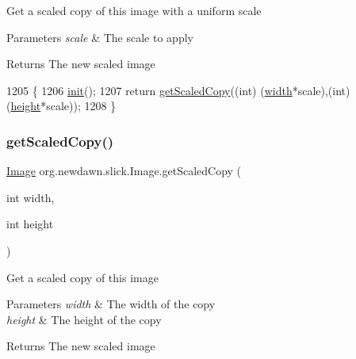 Get a scaled copy of this image with a uniform scale


\begin{DoxyParams}{Parameters}
{\em scale} & The scale to apply \\
\hline
\end{DoxyParams}
\begin{DoxyReturn}{Returns}
The new scaled image 
\end{DoxyReturn}

\begin{DoxyCode}
1205                                             \{
1206         \mbox{\hyperlink{classorg_1_1newdawn_1_1slick_1_1_image_a94d180c9218ba1444a0496a1898ec345}{init}}();
1207         \textcolor{keywordflow}{return} \mbox{\hyperlink{classorg_1_1newdawn_1_1slick_1_1_image_a833a212bc085047713ad21dc246844e9}{getScaledCopy}}((\textcolor{keywordtype}{int}) (\mbox{\hyperlink{classorg_1_1newdawn_1_1slick_1_1_image_a7d02c85e21b388428cfe5cc5c82714a1}{width}}*scale),(\textcolor{keywordtype}{int}) (\mbox{\hyperlink{classorg_1_1newdawn_1_1slick_1_1_image_a54397a37823bc59ddc79ec70dc5cf226}{height}}*scale));
1208     \}
\end{DoxyCode}
\mbox{\label{classorg_1_1newdawn_1_1slick_1_1_image_ae5bec579000a87804bff4421c8b0d020}} 
\subsubsection{\texorpdfstring{get\+Scaled\+Copy()}{getScaledCopy()}\hspace{0.1cm}{\footnotesize\ttfamily [2/2]}}
{\footnotesize\ttfamily \mbox{\hyperlink{classorg_1_1newdawn_1_1slick_1_1_image}{Image}} org.\+newdawn.\+slick.\+Image.\+get\+Scaled\+Copy (\begin{DoxyParamCaption}\item[{int}]{width,  }\item[{int}]{height }\end{DoxyParamCaption})\hspace{0.3cm}{\ttfamily [inline]}}

Get a scaled copy of this image


\begin{DoxyParams}{Parameters}
{\em width} & The width of the copy \\
\hline
{\em height} & The height of the copy \\
\hline
\end{DoxyParams}
\begin{DoxyReturn}{Returns}
The new scaled image 
\end{DoxyReturn}

